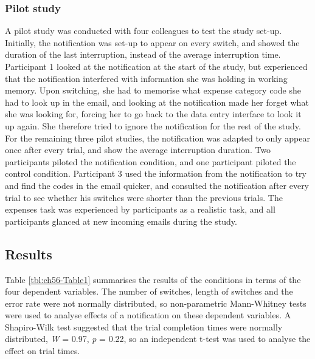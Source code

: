 \subsubsection{Pilot study}
A pilot study was conducted with four colleagues to test the study set-up. Initially, the notification was set-up to appear on every switch, and showed the duration of the last interruption, instead of the average interruption time. Participant 1 looked at the notification at the start of the study, but experienced that the notification interfered with information she was holding in working memory. Upon switching, she had to memorise what expense category code she had to look up in the email, and looking at the notification made her forget what she was looking for, forcing her to go back to the data entry interface to look it up again. She therefore tried to ignore the notification for the rest of the study. For the remaining three pilot studies, the notification was adapted to only appear once after every trial, and show the average interruption duration. Two participants piloted the notification condition, and one participant piloted the control condition. Participant 3 used the information from the notification to try and find the codes in the email quicker, and consulted the notification after every trial to see whether his switches were shorter than the previous trials. The expenses task was experienced by participants as a realistic task, and all participants glanced at new incoming emails during the study.

\subsection{Results}
Table \ref{tbl:ch56-Table1} summarises the results of the conditions in terms of the four dependent variables. The number of switches, length of switches and the error rate were not normally distributed, so non-parametric Mann-Whitney tests were used to analyse effects of a notification on these dependent variables. A Shapiro-Wilk test suggested that the trial completion times were normally distributed, \textit{W} = 0.97, \textit{p} = 0.22, so an independent t-test was used to analyse the effect on trial times. 

